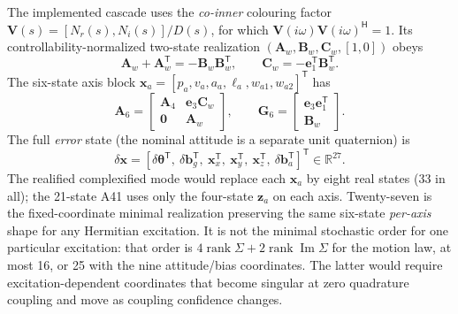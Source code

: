 \documentclass[conference]{IEEEtran}
\newcommand{\vct}[1]{\bm{#1}}
\newcommand{\mat}[1]{\bm{#1}}
\newcommand{\R}{\mathbb R}
\newcommand{\T}{^{\mathsf T}}
\newcommand{\Herm}{^{\mathsf H}}
\newcommand{\Ima}{\operatorname{Im}}
\begin{document}
The implemented cascade uses the \emph{co-inner} colouring factor
$\mat V(s)=[N_r(s),N_i(s)]/D(s)$, for which
$\mat V(i\omega)\mat V(i\omega)\Herm=1$. Its controllability-normalized
two-state realization $(\mat A_w,\mat B_w,\mat C_w,
[1,0])$ obeys
\begin{equation}
 \mat A_w+\mat A_w\T=-\mat B_w\mat B_w\T,\qquad
 \mat C_w=-\vct e_1\T\mat B_w\T.
 \label{eq:inner}
\end{equation}
The six-state axis block $\vct x_a=[p_a,v_a,a_a,\ell_a,w_{a1},w_{a2}]\T$
has
\begin{equation}
 \mat A_6=\begin{bmatrix}
 \mat A_4 & \vct e_3\mat C_w\\
 \mat 0 & \mat A_w
 \end{bmatrix},\qquad
 \mat G_6=\begin{bmatrix}
 \vct e_3\vct e_1\T\\ \mat B_w
 \end{bmatrix}.
 \label{eq:A6}
\end{equation}
The full \emph{error} state (the nominal attitude is a separate unit
quaternion) is
\begin{equation}
 \delta\vct x=\left[\delta\vct\theta\T,\ \delta\vct b_g\T,\
 \vct x_x\T,\ \vct x_y\T,\ \vct x_z\T,\
 \delta\vct b_a\T\right]\T\in\R^{27}.
 \label{eq:states}
\end{equation}
The realified complexified mode would replace each $\vct x_a$ by eight real
states (33 in all); the 21-state A41 uses only the four-state $\vct z_a$ on
each axis.
Twenty-seven is the fixed-coordinate minimal realization preserving the
same six-state \emph{per-axis} shape for any Hermitian excitation. It is
not the minimal stochastic order for one particular excitation: that
order is $4\operatorname{rank}\Sigma+
2\operatorname{rank}\Ima\Sigma$ for the motion law, at most 16, or 25
with the nine attitude/bias coordinates. The latter would require
excitation-dependent coordinates that become singular at zero quadrature
coupling and move as coupling confidence changes.
\end{document}
